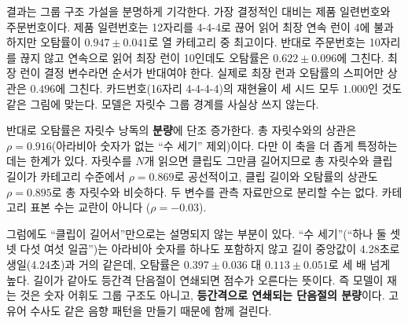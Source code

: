 \documentclass[11pt]{article}
\renewcommand{\emph}[1]{\textbf{#1}}
\begin{document}
결과는 그룹 구조 가설을 분명하게 기각한다. 가장 결정적인 대비는 제품 일련번호와 주문번호이다.
제품 일련번호는 12자리를 4-4-4로 끊어 읽어 최장 연속 런이 4에 불과하지만 오탐률이
$0.947\pm0.041$로 열 카테고리 중 최고이다. 반대로 주문번호는 10자리를 끊지 않고 연속으로
읽어 최장 런이 10인데도 오탐률은 $0.622\pm0.096$에 그친다. 최장 런이 결정 변수라면 순서가
반대여야 한다. 실제로 최장 런과 오탐률의 스피어만 상관은 $0.496$에 그친다. 카드번호(16자리
4-4-4-4)의 재현율이 세 시드 모두 $1.000$인 것도 같은 그림에 맞는다. 모델은 자릿수 그룹
경계를 사실상 쓰지 않는다.

반대로 오탐률은 자릿수 낭독의 \emph{분량}에 단조 증가한다. 총 자릿수와의 상관은
$\rho=0.916$(아라비아 숫자가 없는 ``수 세기'' 제외)이다. 다만 이 축을 더 좁게 특정하는 데는
한계가 있다. 자릿수를 $N$개 읽으면 클립도 그만큼 길어지므로 총 자릿수와 클립 길이가 카테고리
수준에서 $\rho=0.869$로 공선적이고, 클립 길이와 오탐률의 상관도 $\rho=0.895$로 총 자릿수와
비슷하다. 두 변수를 관측 자료만으로 분리할 수는 없다. 카테고리 표본 수는 교란이 아니다
($\rho=-0.03$).

그럼에도 ``클립이 길어서''만으로는 설명되지 않는 부분이 있다. ``수 세기''(``하나 둘 셋 넷 다섯
여섯 일곱'')는 아라비아 숫자를 하나도 포함하지 않고 길이 중앙값이 4.28초로 생일(4.24초)과 거의
같은데, 오탐률은 $0.397\pm0.036$ 대 $0.113\pm0.051$로 세 배 넘게 높다. 길이가 같아도
등간격 단음절이 연쇄되면 점수가 오른다는 뜻이다. 즉 모델이 재는 것은 숫자 어휘도 그룹 구조도
아니고, \emph{등간격으로 연쇄되는 단음절의 분량}이다. 고유어 수사도 같은 음향 패턴을 만들기
때문에 함께 걸린다.
\end{document}
